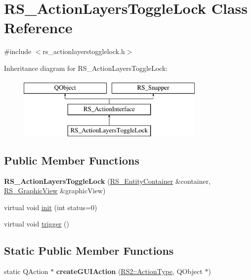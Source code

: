 \hypertarget{classRS__ActionLayersToggleLock}{\section{R\-S\-\_\-\-Action\-Layers\-Toggle\-Lock Class Reference}
\label{classRS__ActionLayersToggleLock}
}


{\ttfamily \#include $<$rs\-\_\-actionlayerstogglelock.\-h$>$}

Inheritance diagram for R\-S\-\_\-\-Action\-Layers\-Toggle\-Lock\-:\begin{figure}[H]
\begin{center}
\leavevmode
\includegraphics[height=3.000000cm]{classRS__ActionLayersToggleLock}
\end{center}
\end{figure}
\subsection*{Public Member Functions}
\begin{DoxyCompactItemize}
\item 
\hypertarget{classRS__ActionLayersToggleLock_afe60c70fd12005edf3b033d959e58890}{{\bfseries R\-S\-\_\-\-Action\-Layers\-Toggle\-Lock} (\hyperlink{classRS__EntityContainer}{R\-S\-\_\-\-Entity\-Container} \&container, \hyperlink{classRS__GraphicView}{R\-S\-\_\-\-Graphic\-View} \&graphic\-View)}\label{classRS__ActionLayersToggleLock_afe60c70fd12005edf3b033d959e58890}

\item 
virtual void \hyperlink{classRS__ActionLayersToggleLock_a7cb30814b69d89be2439490ae0616e6a}{init} (int status=0)
\item 
virtual void \hyperlink{classRS__ActionLayersToggleLock_a0d8ec083e82c8b43d4cf5e807243b442}{trigger} ()
\end{DoxyCompactItemize}
\subsection*{Static Public Member Functions}
\begin{DoxyCompactItemize}
\item 
\hypertarget{classRS__ActionLayersToggleLock_a9e0ef4053c3e65be416a06e493c1cf68}{static Q\-Action $\ast$ {\bfseries create\-G\-U\-I\-Action} (\hyperlink{classRS2_afe3523e0bc41fd637b892321cfc4b9d7}{R\-S2\-::\-Action\-Type}, Q\-Object $\ast$)}\label{classRS__ActionLayersToggleLock_a9e0ef4053c3e65be416a06e493c1cf68}

\end{DoxyCompactItemize}

